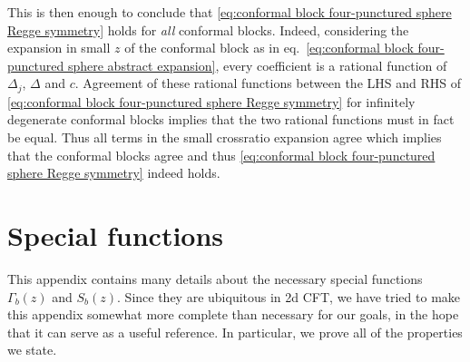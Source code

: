 \documentclass[12pt,a4paper]{article}
\begin{document}
This is then enough to conclude that \eqref{eq:conformal block four-punctured sphere Regge symmetry} holds for \emph{all} conformal blocks. Indeed, considering the expansion in small $z$ of the conformal block as in eq.~\eqref{eq:conformal block four-punctured sphere abstract expansion}, every coefficient is a rational function of $\Delta_j$, $\Delta$ and $c$. Agreement of these rational functions between the LHS and RHS of \eqref{eq:conformal block four-punctured sphere Regge symmetry} for infinitely degenerate conformal blocks implies that the two rational functions must in fact be equal. Thus all terms in the small crossratio expansion agree which implies that the conformal blocks agree and thus \eqref{eq:conformal block four-punctured sphere Regge symmetry} indeed holds.


\section{Special functions} \label{app:special functions}
This appendix contains many details about the necessary special functions $\Gamma_b(z)$ and $S_b(z)$. Since they are ubiquitous in 2d CFT, we have tried to make this appendix somewhat more complete than necessary for our goals, in the hope that it can serve as a useful reference. In particular, we prove all of the properties we state.
\end{document}
